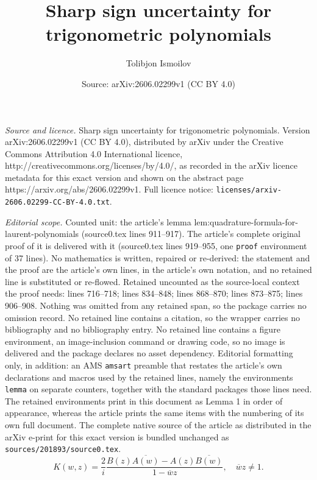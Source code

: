 \documentclass[10pt,a4paper]{amsart}
\title{Sharp sign uncertainty for trigonometric polynomials}
\author{Tolibjon Ismoilov}
\date{Source: arXiv:2606.02299v1 (CC BY 4.0)}
\begin{document}
\maketitle

\noindent\emph{Source and licence.} Sharp sign uncertainty for trigonometric polynomials. Version arXiv:2606.02299v1 (CC BY 4.0), distributed by arXiv under the Creative Commons Attribution 4.0 International licence, http://creativecommons.org/licenses/by/4.0/, as recorded in the arXiv licence metadata for this exact version and shown on the abstract page https://arxiv.org/abs/2606.02299v1. Full licence notice: \texttt{licenses/arxiv-2606.02299-CC-BY-4.0.txt}.\par\smallskip

\noindent\textit{Editorial scope.} Counted unit: the article's lemma lem:quadrature-formula-for-laurent-polynomials (source0.tex lines 911--917). The article's complete original proof of it is delivered with it (source0.tex lines 919--955, one \texttt{proof} environment of 37 lines). No mathematics is written, repaired or re-derived: the statement and the proof are the article's own lines, in the article's own notation, and no retained line is substituted or re-flowed.  Retained uncounted as the source-local context the proof needs: lines 716--718; lines 834--848; lines 868--870; lines 873--875; lines 906--908.  Nothing was omitted from any retained span, so the package carries no omission record.  No retained line contains a citation, so the wrapper carries no bibliography and no bibliography entry.  No retained line contains a figure environment, an image-inclusion command or drawing code, so no image is delivered and the package declares no asset dependency.  Editorial formatting only, in addition: an AMS \texttt{amsart} preamble that restates the article's own declarations and macros used by the retained lines, namely the environments \texttt{lemma} on separate counters, together with the standard packages those lines need.  The retained environments print in this document as Lemma 1 in order of appearance, whereas the article prints the same items with the numbering of its own full document.  The complete native source of the article as distributed in the arXiv e-print for this exact version is bundled unchanged as \texttt{sources/201893/source0.tex}.
\begin{equation}\label{eq:reproducing-kernel-with-A-and-B}
    K(w, z)=\frac{2}{i}\frac{B(z)\overline{A(w)}-A(z)\overline{B(w)}}{1-\overline{w}z}, \quad \overline{w}z\neq 1.
\end{equation}
\end{document}

